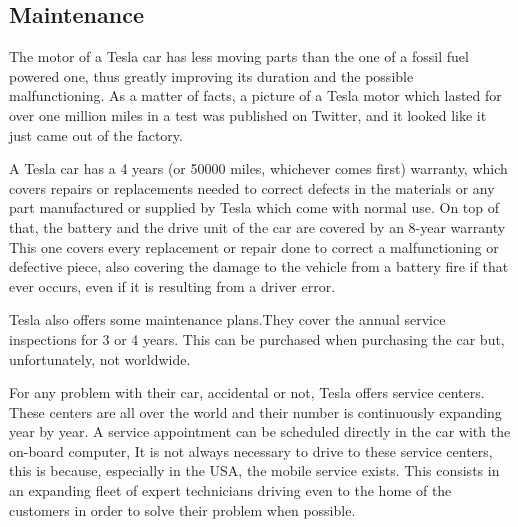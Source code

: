 \subsection{Maintenance}

The motor of a Tesla car has less moving parts than the one of a fossil fuel powered one, thus greatly improving its duration and the possible malfunctioning. As a matter of facts, a picture of a Tesla motor which lasted for over one million miles in a test was published on Twitter, and it looked like it just came out of the factory\cite{tesla1mMiles}.

A Tesla car has a 4 years (or 50000 miles, whichever comes first) warranty, which covers repairs or replacements needed to correct defects in the materials or any part manufactured or supplied by Tesla which come with normal use. On top of that, the battery and the drive unit of the car are covered by an 8-year warranty This one covers every replacement or repair done to correct a malfunctioning or defective piece, also covering the damage to the vehicle from a battery fire if that ever occurs, even if it is resulting from a driver error\cite{teslaWarranty}. 

Tesla also offers some maintenance plans.They cover the annual service inspections for 3 or 4 years. This can be purchased when purchasing the car but, unfortunately, not worldwide. 

For any problem with their car, accidental or not, Tesla offers service centers. These centers are all over the world and their number is continuously expanding year by year. A service appointment can be scheduled directly in the car with the on-board computer, It is not always necessary to drive to these service centers, this is because, especially in the USA, the mobile service exists. This consists in an expanding fleet of expert technicians driving even to the home of the customers in order to solve their problem when possible.





